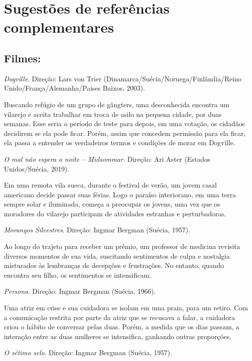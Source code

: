 \documentclass[12pt]{extarticle}
\begin{document}


\section{Sugestões de referências complementares}\label{sugestoes}

\subsection{Filmes:}

\textit{Dogville}. Direção: Lars von Trier (Dinamarca/Suécia/Noruega/Finlândia/Reino Unido/França/Alemanha/Países Baixos, 2003).

Buscando refúgio de um grupo de gângters, uma desconhecida encontra um vilarejo e aceita 
trabalhar em troca de asilo na pequena cidade, por duas semanas. Esse seria o período de teste
para depois, em uma votação, os cidadãos decidirem se ela pode ficar. Porém, assim que concedem 
permissão para ela ficar, ela passa a entender os verdadeiros termos e condições de morar em Dogville.

\textit{O mal não espera a noite -- Midsommar}. Direção: Ari Aster (Estados Unidos/Suécia, 2019).

Em uma remota vila sueca, durante o festival de verão, um jovem casal americano decide passar suas férias. 
Logo o paraíso interiorano, em uma terra sempre solar e iluminada, começa a preocupar os jovens, uma vez que 
os moradores do vilarejo participam de atividades estranhas e perturbadoras.

\textit{Morangos Silvestres}. Direção: Ingmar Bergman (Suécia, 1957).

Ao longo do trajeto para receber um prêmio, um professor de medicina revisita diversos momentos de sua 
vida, suscitando sentimentos de culpa e nostalgia misturados às lembranças de decepções e frustrações. 
No entanto, quando encontra seu filho, os sentimentos se intensificam.

\textit{Persona}. Direção: Ingmar Bergman (Suécia, 1966).

Uma atriz em crise e sua cuidadora se isolam em uma praia, para um retiro. Com a comunicação restrita por parte da atriz 
que se recusava a falar, a cuidadora criou o hábito de conversar pelas duas. Porém, a medida que os dias passam, 
a interação entre as duas mulheres se intensifica, ganhando outras proporções. 

\textit{O sétimo selo}. Direção: Ingmar Bergman (Suécia, 1957).
\end{document}
